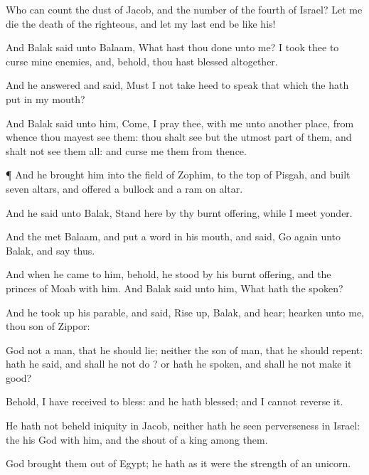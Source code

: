 {Who can
count the
dust of
Jacob, and the
number of the
fourth
{} of
Israel? Let me
die the
death of the
righteous, and let my
last end be like his!

And
Balak
said unto
Balaam, What hast thou
done unto me? I
took thee to
curse mine
enemies, and, behold, thou hast
blessed
{}
altogether.

And he
answered and
said, Must I not take
heed to
speak that which the
{} hath
put in my
mouth?


\par }{\PP {}And
Balak
said unto him,
Come, I pray thee, with me unto
another
place, from whence thou mayest
see them: thou shalt
see
but the
utmost part of them, and shalt not
see them all: and
curse me them from thence.


\par }{\PP {}¶ And he
brought him into the
field of
Zophim, to the
top of
Pisgah, and
built
seven
altars, and
offered a
bullock and a
ram on
{}
altar.

And he
said unto
Balak,
Stand
here by thy burnt
offering, while I
meet
{}
yonder.

And the
{}
met
Balaam, and
put a
word in his
mouth, and
said, Go
again unto
Balak, and
say thus.

And when he
came to him, behold, he
stood by his burnt
offering, and the
princes of
Moab with him. And
Balak
said unto him, What hath the
{}
spoken?

And he took
up his
parable, and
said, Rise
up,
Balak, and
hear;
hearken unto me, thou
son of
Zippor:

God
{} not a
man, that he should
lie; neither the
son of
man, that he should
repent: hath he
said, and shall he not
do
{}? or hath he
spoken, and shall he not make it
good?

Behold, I have
received
{} to
bless: and he hath
blessed; and I cannot
reverse it.

He hath not
beheld
iniquity in
Jacob, neither hath he
seen
perverseness in
Israel: the
{} his
God
{} with him, and the
shout of a
king
{} among them.

God brought them
out of
Egypt; he hath as it were the
strength of an
unicorn.

}
